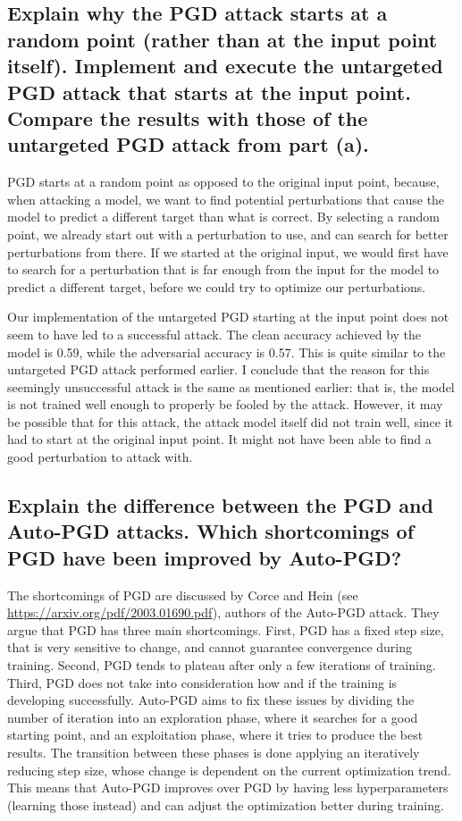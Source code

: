 \documentclass{article}
\begin{document}
\subsection{Explain why the PGD attack starts at a random point (rather than
at the input point itself). Implement and execute the untargeted PGD attack
that starts at the input point. Compare the results with those of the untargeted
PGD attack from part (a).}
PGD starts at a random point as opposed to the original input point, because, when attacking a model, we want to find potential perturbations that cause the model to predict a different target than what is correct.
By selecting a random point, we already start out with a perturbation to use, and can search for better perturbations from there.
If we started at the original input, we would first have to search for a perturbation that is far enough from the input for the model to predict a different target, before we could try to optimize our perturbations.

Our implementation of the untargeted PGD starting at the input point does not seem to have led to a successful attack.
The clean accuracy achieved by the model is 0.59, while the adversarial accuracy is 0.57.
This is quite similar to the untargeted PGD attack performed earlier.
I conclude that the reason for this seemingly unsuccessful attack is the same as mentioned earlier: that is, the model is not trained well enough to properly be fooled by the attack.
However, it may be possible that for this attack, the attack model itself did not train well, since it had to start at the original input point.
It might not have been able to find a good perturbation to attack with.

\subsection{Explain the difference between the PGD and Auto-PGD attacks. Which
shortcomings of PGD have been improved by Auto-PGD?}
The shortcomings of PGD are discussed by Corce and Hein (see \url{https://arxiv.org/pdf/2003.01690.pdf}), authors of the Auto-PGD attack. 
They argue that PGD has three main shortcomings.
First, PGD has a fixed step size, that is very sensitive to change, and cannot guarantee convergence during training.
Second, PGD tends to plateau after only a few iterations of training.
Third, PGD does not take into consideration how and if the training is developing successfully.
Auto-PGD aims to fix these issues by dividing the number of iteration into an exploration phase, where it searches for a good starting point, and an exploitation phase, where it tries to produce the best results.
The transition between these phases is done applying an iteratively reducing step size, whose change is dependent on the current optimization trend.
This means that Auto-PGD improves over PGD by having less hyperparameters (learning those instead) and can adjust the optimization better during training.
\end{document}

